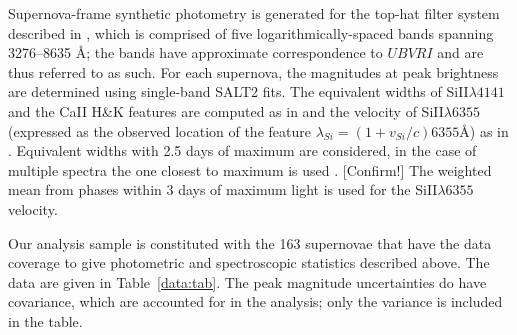 \documentclass{aastex}   	%
\begin{document}
Supernova-frame synthetic photometry is generated for the top-hat filter system
described in \citet{2011A&A...529L...4C}, which is comprised of five logarithmically-spaced bands spanning
3276--8635 \AA; the bands have approximate correspondence to $UBVRI$ and are thus referred to as such.
For each supernova, the magnitudes at peak brightness are determined using single-band SALT2 fits.
The equivalent widths of SiII$\lambda 4141$ and the CaII H\&K features are computed as
in \citet{2008A&A...477..717B} and the  velocity of SiII$\lambda 6355$ (expressed as the
observed location of the feature $\lambda_{Si} = (1+v_{Si}/c) 6355$\AA)
as in \citet{chotard:thesis}.
Equivalent widths with 2.5 days of maximum are considered, in the case of multiple spectra the one
closest to maximum is used \citep{chotard:thesis}. [Confirm!]
The weighted mean from phases within 3 days of maximum light is used for the  SiII$\lambda 6355$ velocity.

Our analysis sample is constituted with the  163 supernovae that have the data coverage to 
give photometric and spectroscopic statistics described above.
The data are given in Table~\ref{data:tab}.
The peak magnitude uncertainties do have covariance, which are accounted
for in the analysis; only the variance is included in the table.
\end{document}
